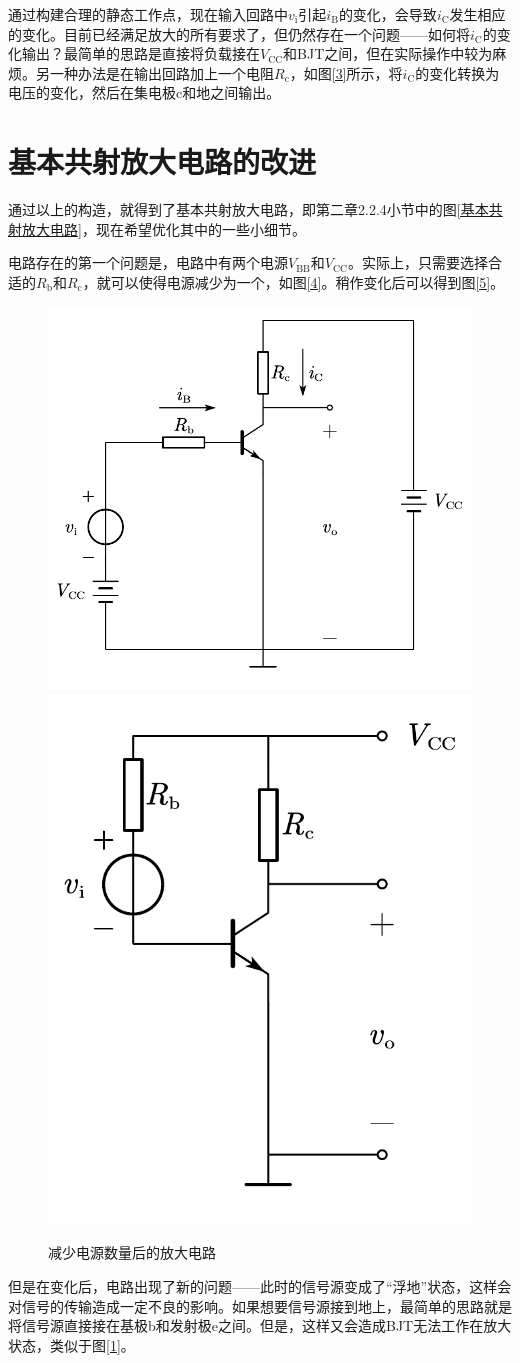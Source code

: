 通过构建合理的静态工作点，现在输入回路中$v_\mathrm{i}$引起$i_\mathrm{B}$的变化，会导致$i_\mathrm{C}$发生相应的变化。目前已经满足放大的所有要求了，但仍然存在一个问题——如何将$i_\mathrm{C}$的变化输出？最简单的思路是直接将负载接在$V_\mathrm{CC}$和BJT之间，但在实际操作中较为麻烦。另一种办法是在输出回路加上一个电阻$R_\mathrm{c}$，如图\ref{3}所示，将$i_\mathrm{C}$的变化转换为电压的变化，然后在集电极c和地之间输出。

\section{基本共射放大电路的改进}
通过以上的构造，就得到了基本共射放大电路，即第二章2.2.4小节中的图\ref{基本共射放大电路}，现在希望优化其中的一些小细节。

电路存在的第一个问题是，电路中有两个电源$V_\mathrm{BB}$和$V_\mathrm{CC}$。实际上，只需要选择合适的$R_\mathrm{b}$和$R_\mathrm{c}$，就可以使得电源减少为一个，如图\ref{4}。稍作变化后可以得到图\ref{5}。
\begin{figure}[htb]
    \centering
        {\includegraphics[width=0.35\linewidth]{pic/appendixApic/4.pdf}}\qquad
        {\includegraphics[width=0.25\linewidth]{pic/appendixApic/5.pdf}}
        \caption{减少电源数量后的放大电路\label{减少电源数量后的放大电路}}
\end{figure}

但是在变化后，电路出现了新的问题——此时的信号源变成了“浮地”状态，这样会对信号的传输造成一定不良的影响。如果想要信号源接到地上，最简单的思路就是将信号源直接接在基极b和发射极e之间。但是，这样又会造成BJT无法工作在放大状态，类似于图\ref{1}。

